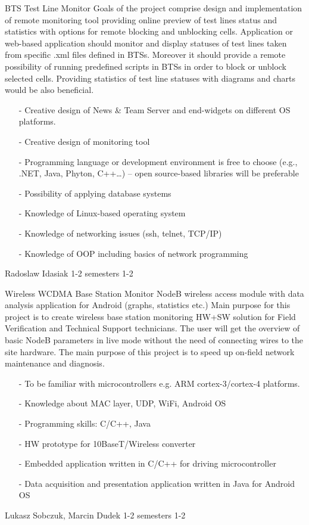 \begin{project}
{BTS Test Line Monitor}
{
Goals of the project comprise design and implementation of remote monitoring
tool providing online preview of test lines status and statistics with options for remote blocking and unblocking cells. } 
{
Application or web-based application should monitor and display statuses of test
lines taken from specific .xml files defined in BTSs. Moreover it should provide a remote possibility of running predefined scripts in BTSs in order to block or unblock selected cells. Providing statistics of test line statuses with diagrams and charts would be also beneficial. }
{
\begin{itemize}
\item[-] Creative design of News \& Team Server and end-widgets on different OS
platforms.
\item[-] Creative design of monitoring tool
\item[-] Programming language or development environment is free to choose
(e.g., .NET, Java, Phyton, C++…) – open source-based libraries will be
preferable
\item[-]  Possibility of applying database systems
\item[-]  Knowledge of Linux-based operating system
\item[-]  Knowledge of networking issues (ssh, telnet, TCP/IP)
\item[-]  Knowledge of OOP including basics of network programming
\end{itemize} }
{Radoslaw Idasiak}
{1-2 semesters}
{1-2}
\end{project}
\begin{project}
{Wireless WCDMA Base Station Monitor}
{
NodeB wireless access module with data analysis application for Android (graphs, statistics etc.) } 
{
Main purpose for this project is to create wireless base station monitoring
HW+SW solution for Field Verification and Technical Support technicians.
The user will get the overview of basic NodeB parameters in live mode without the
need of connecting wires to the site hardware. The main purpose of this project 
is to speed up on-field network maintenance and diagnosis. 
}
{
\begin{itemize}
\item[-] To be familiar with microcontrollers e.g. ARM cortex-3/cortex-4
platforms.
\item[-] Knowledge about MAC layer, UDP, WiFi, Android OS
\item[-] Programming skills: C/C++, Java
\item[-] HW prototype for 10BaseT/Wireless converter
\item[-] Embedded application written in C/C++ for driving microcontroller
\item[-] Data acquisition and presentation application written in Java for Android OS
\end{itemize} 
}
{Lukasz Sobczuk, Marcin Dudek}
{1-2 semesters}
{1-2}
\end{project}
